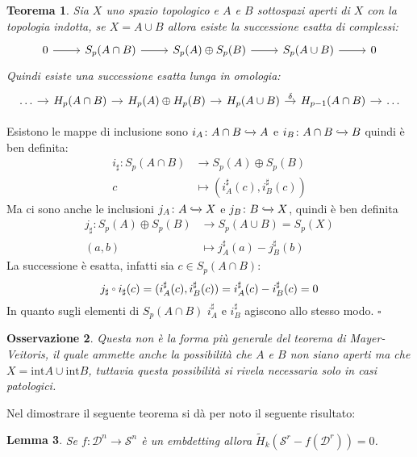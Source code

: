 \documentclass[10pt, twoside=false, x11names]{scrbook}
\newtheorem{theorem}{Teorema}[section]
\newtheorem{lemma}[theorem]{Lemma}
\newtheorem{osservation}[theorem]{Osservazione}
\newenvironment{proof}{{\textbf{Dimostrazione}:}}{\hfill $\square$}
\newcommand{\Sph}[1][]{\mathcal{S}^#1}
\newcommand{\Disk}[1][]{\mathcal{D}^#1}
\newcommand{\incl}{\xhookrightarrow{}}
\let\latexcirc=\circ
\newcommand{\ccirc}{\mathbin{\mathchoice
  {\xcirc\scriptstyle}
  {\xcirc\scriptstyle}
  {\xcirc\scriptscriptstyle}
  {\xcirc\scriptscriptstyle}
}}
\newcommand{\xcirc}[1]{\vcenter{\hbox{$#1\latexcirc$}}}
\let\circ\ccirc
\let\setminus-
\begin{document}
\begin{theorem}
  Sia $ X $ uno spazio topologico e $ A $ e $ B $ sottospazi aperti di $ X $ con la
  topologia indotta, se $ X = A \cup B $ allora esiste la successione esatta di complessi:
  \[
    \begin{tikzcd}
      0 \rar & S_p(A \cap B) \rar & S_p(A) \oplus S_p(B) \rar & S_p(A \cup B) \rar & 0
    \end{tikzcd}
  \]
  Quindi esiste una successione esatta lunga in omologia:
  \[
    \begin{tikzcd}[nodes = {column sep = 10 pt}]
      \dots \rar & H_p(A \cap B) \rar & H_p(A) \oplus H_p(B) \rar & H_p(A \cup B) \rar{\delta} & H_{p-1}(A \cap B) \rar & \dots
    \end{tikzcd}
  \]
\end{theorem}
\begin{proof}
  Esistono le mappe di inclusione sono $ i_A \colon A \cap B \incl A $ e $ i_B \colon A \cap B \incl B $ quindi
  è ben definita:
  \begin{align*}
    i_\sharp \colon S_p(A \cap B) & \to S_p(A) \oplus S_p(B) \\
    c & \mapsto (i_A^\sharp (c), i_B^\sharp (c))
  \end{align*}
  Ma ci sono anche le inclusioni $ j_A \colon A \incl X $ e $ j_B \colon B \incl X $,
  quindi è ben definita
  \begin{align*}
    j_\sharp \colon  S_p(A) \oplus S_p(B) & \to S_p(A \cup B) = S_p(X) \\
    (a,b) &  \mapsto j_A^\sharp(a) - j_B^\sharp(b)
  \end{align*}
  La successione è esatta, infatti sia $ c \in S_p(A \cap B) $:
  \[
    j_\sharp \circ i_\sharp (c) = (i_A^\sharp (c), i_B^\sharp (c)) = i_A^\sharp (c) -  i_B^\sharp (c) = 0
  \]
  In quanto sugli elementi di $ S_p(A \cap B) $ $ i_A^\sharp $ e $ i_B^\sharp $ agiscono
  allo stesso modo.
\end{proof}

\begin{osservation}
  Questa non è la forma più generale del teorema di Mayer-Veitoris, il quale
  ammette anche la possibilità che $ A $ e $ B $ non siano aperti ma che
  $ X = \mathrm{int} A \cup \mathrm{int} B $, tuttavia questa possibilità si rivela
  necessaria solo in casi patologici.
\end{osservation}

Nel dimostrare il seguente teorema si dà per noto il seguente risultato:
\begin{lemma}
  Se $ f \colon \Disk{n} \to \Sph{n} $ è un embdetting allora $ \tilde{H}_k(\Sph{r} \setminus f(\Disk{r})) = 0 $.
\end{lemma}
\end{document}
